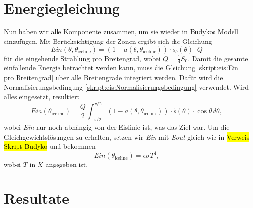 \begin{refsection}
\section{Energiegleichung}
Nun haben wir alle Komponente zusammen, um sie wieder in Budykos Modell einzufügen. Mit Berücksichtigung der Zonen ergibt sich die Gleichung
\begin{equation}\label{skript:eis:Ein pro Breitengrad}
Ein(\theta,\theta_\text{iceline})
=
(1-a(\theta,\theta_\text{iceline}))\cdot\tilde{s}_{b}(\theta)\cdot Q
\end{equation}
für die eingehende Strahlung pro Breitengrad, wobei $Q=\tfrac{1}{4}S_{0}$. Damit die gesamte einfallende Energie betrachtet werden kann, muss die Gleichung \eqref{skript:eis:Ein pro Breitengrad} über alle Breitengrade integriert werden. Dafür wird die Normalisierungsbedingung \eqref{skript:eis:Normalisierungsbedingung} verwendet. Wird alles eingesetzt, resultiert
\begin{equation}\label{skript:eis:Ein abh ice line}
Ein(\theta_\text{iceline})
=
\frac{Q}{2}\int_{-\pi/2}^{\pi/2}(1-a(\theta,\theta_\text{iceline}))\cdot\tilde{s}(\theta)\cdot\cos\theta\,d\theta,
\end{equation}
wobei {\em Ein} nur noch abhängig von der Eislinie ist, was das Ziel war.
Um die Gleichgewichtslösungen zu erhalten, setzen wir {\em Ein} mit {\em Eout} gleich wie in \hl{Verweis Skript Budyko} und bekommen
\begin{equation}\label{skript:eis:Gleichgewichtsgleichung}
	Ein(\theta_\text{iceline})
	=
	\epsilon\sigma T^4,
\end{equation}
wobei $T$ in $K$ angegeben ist.
\section{Resultate} \label{skript:eis:Resultate}

\end{refsection}
